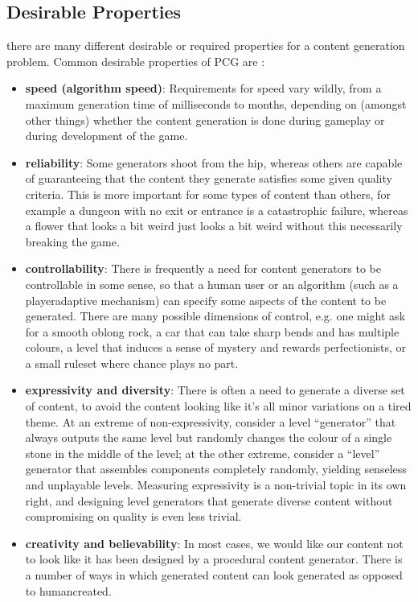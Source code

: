 \documentclass[MGS,Master,english]{twbook}%
\begin{document}
\subsection{Desirable Properties}
there are many different desirable or required properties for a content generation problem. Common desirable properties of PCG are \cite{pcg::book}:
\begin{itemize}
	\item \textbf{speed (algorithm speed)}: Requirements for speed vary wildly, from a maximum generation time of 	milliseconds to months, depending on (amongst other things) whether the content generation is done during gameplay or during development of the game.
	\item \textbf{reliability}: Some generators shoot from the hip, whereas others are capable of 	guaranteeing that the content they generate satisfies some given quality criteria. 	This is more important for some types of content than others, for example a dungeon with no exit or entrance is a catastrophic failure, whereas a flower that	looks a bit weird just looks a bit weird without this necessarily breaking the game.
	\item \textbf{controllability}: There is frequently a need for content generators to be controllable 	in some sense, so that a human user or an algorithm (such as a playeradaptive 	mechanism) can specify some aspects of the content to be generated. There are many possible dimensions of control, e.g. one might ask for a smooth oblong rock, a car that can take sharp bends and has multiple colours, a level that induces a sense of mystery and rewards perfectionists, or a small ruleset where chance plays no part.
	\item \textbf{expressivity and diversity}: There is often a need to generate a diverse set of content, to avoid the content looking like it’s all minor variations on a tired theme. At an extreme of non-expressivity, consider a level “generator” that always outputs the same level but randomly changes the colour of a single stone in the middle of the level; at the other extreme, consider a “level” generator that assembles components completely randomly, yielding senseless and unplayable levels. Measuring expressivity is a non-trivial topic in its own right, and designing level generators that generate diverse content without compromising on quality is even less trivial.
	\item \textbf{creativity and believability}: In most cases, we would like our content not to look like it has been designed by a procedural content generator. There is a number of ways in which generated content can look generated as opposed to humancreated.
\end{itemize}
\end{document}
